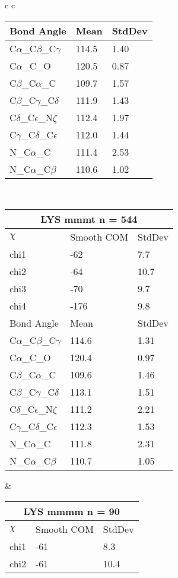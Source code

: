 \begin{longtable}{ c c }
\begin{tabular}{ l l l }
  Bond Angle   & Mean     & StdDev \\ \midrule
  C$\alpha$\_C$\beta$\_C$\gamma$ & 114.5 & 1.40\\
  C$\alpha$\_C\_O & 120.5 & 0.87\\
  C$\beta$\_C$\alpha$\_C & 109.7 & 1.57\\
  C$\beta$\_C$\gamma$\_C$\delta$ & 111.9 & 1.43\\
  C$\delta$\_C$\epsilon$\_N$\zeta$ & 112.4 & 1.97\\
  C$\gamma$\_C$\delta$\_C$\epsilon$ & 112.0 & 1.44\\
  N\_C$\alpha$\_C & 111.4 & 2.53\\
  N\_C$\alpha$\_C$\beta$ & 110.6 & 1.02\\
  \bottomrule
  \end{tabular}
  \\
  \begin{tabular}{ l l l }
  \toprule
  \multicolumn{3}{c}{LYS \textbf{mmmt} n = 544} \\ \toprule
  $\chi$       & Smooth COM & StdDev \\ \midrule
  chi1 & -62 & 7.7 \\ 
  chi2 & -64 & 10.7 \\ 
  chi3 & -70 & 9.7 \\ 
  chi4 & -176 & 9.8 \\ \midrule
  Bond Angle   & Mean     & StdDev \\ \midrule
  C$\alpha$\_C$\beta$\_C$\gamma$ & 114.6 & 1.31\\
  C$\alpha$\_C\_O & 120.4 & 0.97\\
  C$\beta$\_C$\alpha$\_C & 109.6 & 1.46\\
  C$\beta$\_C$\gamma$\_C$\delta$ & 113.1 & 1.51\\
  C$\delta$\_C$\epsilon$\_N$\zeta$ & 111.2 & 2.21\\
  C$\gamma$\_C$\delta$\_C$\epsilon$ & 112.3 & 1.53\\
  N\_C$\alpha$\_C & 111.8 & 2.31\\
  N\_C$\alpha$\_C$\beta$ & 110.7 & 1.05\\
  \bottomrule
  \end{tabular}
  &
  \begin{tabular}{ l l l }
  \toprule
  \multicolumn{3}{c}{LYS \textbf{mmmm} n = 90} \\ \toprule
  $\chi$       & Smooth COM & StdDev \\ \midrule
  chi1 & -61 & 8.3 \\ 
  chi2 & -61 & 10.4 \\ 

\end{tabular}
\end{longtable}
